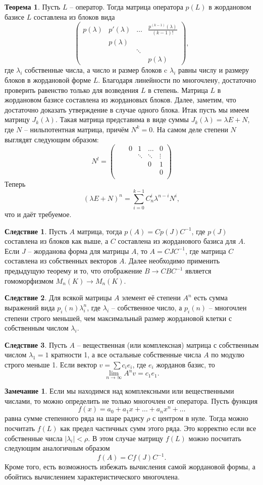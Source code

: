 \documentclass[10pt,a4paper,oneside]{book} %
\theoremstyle{definition}
\newtheorem*{rem}{Замечание}
\newtheorem{thm}{Теорема}
\newtheorem{cor}{Следствие}
\def\thrm{\begin{thm}}
\def\ethrm{\end{thm}}
\def\crl{\begin{cor}}
\def\ecrl{\end{cor}}
\def\rm{\begin{rem}}
\def\erm{\end{rem}}
\def\pmat{\begin{pmatrix}}
\def\epmat{\end{pmatrix}}
\begin{document}
\thrm
Пусть $L$ -- оператор. Тогда матрица оператора $p(L)$ в жордановом базисе $L$ составлена из блоков вида
$$ \pmat p(\lambda) & p'(\lambda) & \dots & \frac{p^{(k-1)}(\lambda)}{(k-1)!}\\
 &  p(\lambda) & &\\
 &            & \ddots & \\
 &&&  p(\lambda) \epmat,$$
где $\lambda_i$ собственные числа, а число и размер блоков c $\lambda_i$ равны числу и размеру блоков в жордановой форме $L$.
\proof Благодаря линейности по многочлену, достаточно проверить равенство только для возведения $L$ в степень. Матрица $L$ в жордановом базисе составлена из жордановых блоков. Далее, заметим, что достаточно доказать утверждение в случае одного блока. Итак пусть мы имеем матрицу $J_k(\lambda)$. Такая матрица представима в виде суммы $J_k(\lambda)= \lambda E + N$, где $N$ -- нильпотентная матрица, причём $N^k=0$. На самом деле степени $N$ выглядят следующим образом:
$$N^l= \pmat  & &0& 1& \dots &0 \\
   & && \ddots &\ddots& \vdots\\
 &&&&0& 1\\
 &&&&& 0 \\
 &&&&&  \epmat $$
Теперь
$$(\lambda E+N)^n= \sum_{i=0}^{k-1} C_n^i\lambda^{n-i}N^i,$$
что и даёт требуемое.
\endproof
\ethrm

\crl Пусть $A$ матрица, тогда $p(A)=C p(J) C^{-1}$, где $p(J)$ составлена из блоков как выше, а $C$ составлена из жорданового базиса для $A$.
\proof Если $J$ -- жорданова форма для матрицы $A$, то $A=CJC^{-1}$, где матрица $C$ составлена из собственных векторов $A$. Далее необходимо применить предыдущую теорему и то, что отображение $B \to CBC^{-1}$ является гомоморфизмом $M_n(K) \to M_n(K)$.
\endproof
\ecrl

\crl Для всякой матрицы $A$ элемент её степени $A^n$ есть сумма выражений вида $p_i(n)\lambda_i^n$, где $\lambda_i$ -- собственное число, а $p_i(n)$ -- многочлен степени строго меньшей, чем максимальный размер жордановой клетки с собственным числом $\lambda_i$.
\ecrl

\crl Пусть $A$ -- вещественная (или комплексная) матрица с собственным числом $\lambda_1=1$ кратности 1, а все остальные собственные числа $A$ по модулю строго меньше 1. Если вектор $v= \sum c_i e_i$, где $e_i$ жорданов базис, то $$\lim_{n \to \infty}A^nv= c_1 e_1.$$
\ecrl

\rm Если мы находимся над комплексными или вещественными числами, то можно определить не только многочлен от оператора. Пусть функция $$f(x)=a_0 +a_1 x+ \dots + a_n x^n + \dots$$ равна сумме степенного ряда на шаре радису $\rho$ с центром в нуле. Тогда можно посчитать $f(L)$ как предел частичных сумм этого ряда. Это корректно если все собственные числа $|\lambda_i|< \rho$. В этом случае матрицу $f(L)$ можно посчитать следующим аналогичным образом
$$f(A)= C f(J) C^{-1}.$$
Кроме того, есть возможность избежать вычисления самой жордановой формы, а обойтись вычислением характеристического многочлена.
\erm
\end{document}
